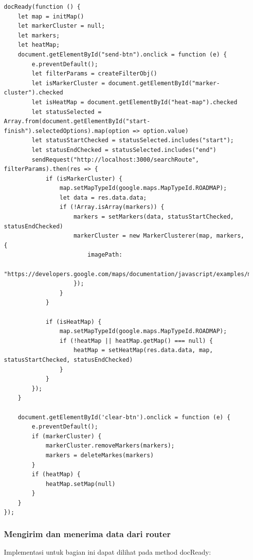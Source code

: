 \newpage
\begin{lstlisting}[label=docReady_1 , caption=docReady Method]
docReady(function () {
    let map = initMap()
    let markerCluster = null;
    let markers;
    let heatMap;
    document.getElementById("send-btn").onclick = function (e) {
        e.preventDefault();
        let filterParams = createFilterObj()
        let isMarkerCluster = document.getElementById("marker-cluster").checked
        let isHeatMap = document.getElementById("heat-map").checked
        let statusSelected = Array.from(document.getElementById("start-finish").selectedOptions).map(option => option.value)
        let statusStartChecked = statusSelected.includes("start");
        let statusEndChecked = statusSelected.includes("end")
        sendRequest("http://localhost:3000/searchRoute", filterParams).then(res => {
            if (isMarkerCluster) {
                map.setMapTypeId(google.maps.MapTypeId.ROADMAP);
                let data = res.data.data;
                if (!Array.isArray(markers)) {
                    markers = setMarkers(data, statusStartChecked, statusEndChecked)
                    markerCluster = new MarkerClusterer(map, markers, {
                        imagePath:
                            "https://developers.google.com/maps/documentation/javascript/examples/markerclusterer/m",
                    });
                }
            }

            if (isHeatMap) {
                map.setMapTypeId(google.maps.MapTypeId.ROADMAP);
                if (!heatMap || heatMap.getMap() === null) {
                    heatMap = setHeatMap(res.data.data, map, statusStartChecked, statusEndChecked)
                }
            }
        });
    }

    document.getElementById('clear-btn').onclick = function (e) {
        e.preventDefault();
        if (markerCluster) {
            markerCluster.removeMarkers(markers);
            markers = deleteMarkes(markers)
        }
        if (heatMap) {
            heatMap.setMap(null)
        }
    }
});

\end{lstlisting}

\newpage \subsubsection{Mengirim dan menerima data dari router}
Implementasi untuk bagian ini dapat dilihat pada method docReady:

